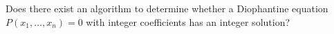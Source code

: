 Does there exist an algorithm to determine whether a Diophantine equation $P(x_1,\ldots,x_n)=0$ with integer coefficients has an integer solution?
